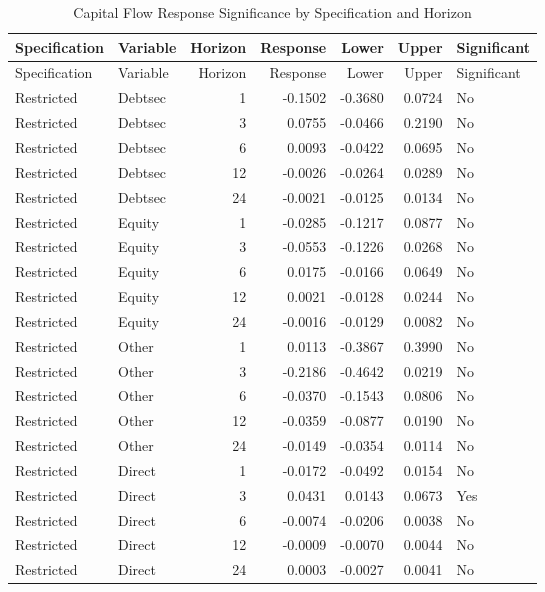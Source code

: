 \FloatBarrier
\begin{longtable}{@{}l l r r r r l@{}}
  \caption{Capital Flow Response Significance by Specification and Horizon} \label{tab:flowsig} \\
  \toprule
  Specification & Variable & Horizon & Response & Lower & Upper & Significant \\
  \midrule
  \endfirsthead
  \toprule
  Specification & Variable & Horizon & Response & Lower & Upper & Significant \\
  \midrule
  \endhead
  \bottomrule
  \endlastfoot
  \small
Restricted & Debtsec & 1 & -0.1502 & -0.3680 & 0.0724 & No \\
Restricted & Debtsec & 3 & 0.0755 & -0.0466 & 0.2190 & No \\
Restricted & Debtsec & 6 & 0.0093 & -0.0422 & 0.0695 & No \\
Restricted & Debtsec & 12 & -0.0026 & -0.0264 & 0.0289 & No \\
Restricted & Debtsec & 24 & -0.0021 & -0.0125 & 0.0134 & No \\
Restricted & Equity & 1 & -0.0285 & -0.1217 & 0.0877 & No \\
Restricted & Equity & 3 & -0.0553 & -0.1226 & 0.0268 & No \\
Restricted & Equity & 6 & 0.0175 & -0.0166 & 0.0649 & No \\
Restricted & Equity & 12 & 0.0021 & -0.0128 & 0.0244 & No \\
Restricted & Equity & 24 & -0.0016 & -0.0129 & 0.0082 & No \\
Restricted & Other & 1 & 0.0113 & -0.3867 & 0.3990 & No \\
Restricted & Other & 3 & -0.2186 & -0.4642 & 0.0219 & No \\
Restricted & Other & 6 & -0.0370 & -0.1543 & 0.0806 & No \\
Restricted & Other & 12 & -0.0359 & -0.0877 & 0.0190 & No \\
Restricted & Other & 24 & -0.0149 & -0.0354 & 0.0114 & No \\
Restricted & Direct & 1 & -0.0172 & -0.0492 & 0.0154 & No \\
Restricted & Direct & 3 & 0.0431 & 0.0143 & 0.0673 & Yes \\
Restricted & Direct & 6 & -0.0074 & -0.0206 & 0.0038 & No \\
Restricted & Direct & 12 & -0.0009 & -0.0070 & 0.0044 & No \\
Restricted & Direct & 24 & 0.0003 & -0.0027 & 0.0041 & No \\

\end{longtable}
